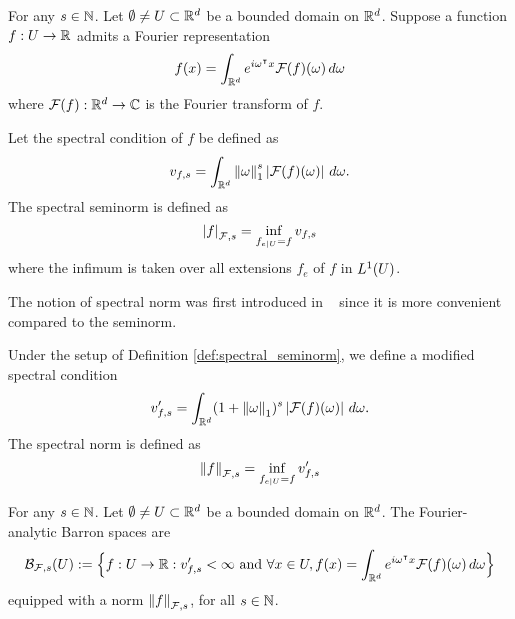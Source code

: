 \begin{definition}
    \label{def:spectral_seminorm}
    For any $s \in \mathbb{N}$. Let $\emptyset \not= U \subset \mathbb{R}^d$ be a bounded
    domain on $\mathbb{R}^d$. Suppose a function $f: U \to \mathbb{R}$ admits a Fourier
    representation
    \begin{equation}
        f(x) = \int_{\mathbb{R}^d} e^{i\omega{}^{\intercal} x} \mathcal{F}(f)(\omega) \,d\omega
    \end{equation}
    where $\mathcal{F}(f): \mathbb{R}^d \to \mathbb{C}$ is the Fourier transform of $f$.

    Let the spectral condition of $f$ be defined as
    \begin{equation}
        \label{eq:spectral_condition}
        v_{f,s} 
            = \int_{\mathbb{R}^d} \left\| \omega \right\|_1^s \left| \mathcal{F}(f)(\omega) \right|\,d\omega.
    \end{equation}
    The spectral seminorm is defined as
    \begin{equation}
        \left| f \right|_{\mathcal{F}, {s}} = \inf_{f_{e\mid U} = f} v_{f,s}
    \end{equation}
    where the infimum is taken over all extensions $f_e$ of $f$ in $L^{1}(U)$.
\end{definition}

The notion of spectral norm was first introduced in
~\cite{siegelApproximationRatesNeural2021} since it is more convenient compared
to the seminorm.

\begin{definition}
    \label{def:spectral_norm}
    Under the setup of Definition \ref{def:spectral_seminorm}, we define a
    modified spectral condition
    \begin{equation}
        \label{eq:spectral_condition_mod}
        v'_{f,s} 
            = \int_{\mathbb{R}^d} (1 + \left\| \omega \right\|_1)^s \left| \mathcal{F}(f)(\omega) \right|
            \,d\omega.
    \end{equation}
    The spectral norm is defined as
    \begin{equation}
        \left\| f \right\|_{\mathcal{F}, {s}} = \inf_{f_{e\mid U} = f} v'_{f,s}
    \end{equation}
\end{definition}

\begin{definition}
    \label{def:fourier_space}
    For any $s \in \mathbb{N}$. Let $\emptyset \not= U \subset \mathbb{R}^d$ be a bounded
    domain on $\mathbb{R}^d$. The Fourier-analytic Barron spaces are
    \begin{equation}
        \mathcal{B}_{\mathcal{F},s}(U) := \Big\{
            f: U \to \mathbb{R}: v'_{f,s} < \infty  \textnormal{ and }
            \forall x\in U, 
                f(x) = \int_{\mathbb{R}^d} e^{i\omega{}^{\intercal} x} \mathcal{F}(f)(\omega)\,d\omega
        \Big\}
    \end{equation}
    equipped with a norm $\left\| f \right\|_{\mathcal{F}, {s}}$, for all $s \in \mathbb{N}$.
\end{definition}

